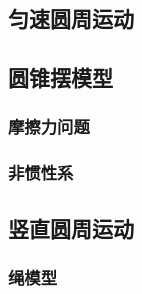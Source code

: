 \documentclass[cn,blue,11pt,normal]{elegantnote}
\begin{document}
\subsection{匀速圆周运动}
\begin{proset}
	
\end{proset}
\begin{proset}
	
\end{proset}
\begin{proset}
	
\end{proset}

\subsection{圆锥摆模型}
\begin{proset}
	
\end{proset}
\begin{proset}
	
\end{proset}

\subsubsection{摩擦力问题}
\begin{proset}
	
\end{proset}
\begin{proset}
	
\end{proset}

\subsubsection{非惯性系}
\begin{proset}
	
\end{proset}
\subsection{竖直圆周运动}

\subsubsection{绳模型}
\begin{proset}
	
\end{proset}
\begin{proset}
	
\end{proset}
\end{document}
